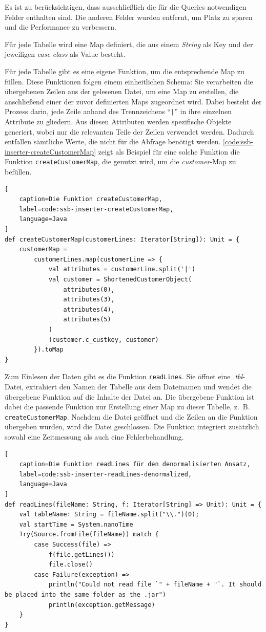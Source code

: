 Es ist zu berücksichtigen, dass ausschließlich die für die Queries notwendigen Felder enthalten sind. Die anderen Felder wurden entfernt, um Platz zu sparen und die Performance zu verbessern.

Für jede Tabelle wird eine Map definiert, die aus einem \emph{String} als Key und der jeweiligen \emph{case class} als Value besteht.

Für jede Tabelle gibt es eine eigene Funktion, um die entsprechende Map zu füllen. Diese Funktionen folgen einem einheitlichen Schema: Sie verarbeiten die übergebenen Zeilen aus der gelesenen Datei, um eine Map zu erstellen, die anschließend einer der zuvor definierten Maps zugeordnet wird. Dabei besteht der Prozess darin, jede Zeile anhand des Trennzeichens \enquote{\lstinline+|+} in ihre einzelnen Attribute zu gliedern. Aus diesen Attributen werden spezifische Objekte generiert, wobei nur die relevanten Teile der Zeilen verwendet werden. Dadurch entfallen sämtliche Werte, die nicht für die Abfrage benötigt werden. \cref{code:ssb-inserter-createCustomerMap} zeigt als Beispiel für eine solche Funktion die Funktion  \lstinline|createCustomerMap|, die genutzt wird, um die \emph{customer}-Map zu befüllen.

\begin{lstlisting}[
    caption=Die Funktion createCustomerMap,
    label=code:ssb-inserter-createCustomerMap,
    language=Java
]
def createCustomerMap(customerLines: Iterator[String]): Unit = {
	customerMap =
		customerLines.map(customerLine => {
			val attributes = customerLine.split('|')
			val customer = ShortenedCustomerObject(
				attributes(0),
				attributes(3),
				attributes(4),
				attributes(5)
			)
			(customer.c_custkey, customer)
		}).toMap
}
\end{lstlisting}


Zum Einlesen der Daten gibt es die Funktion \lstinline|readLines|. Sie öffnet eine \emph{.tbl}-Datei, extrahiert den Namen der Tabelle aus dem Dateinamen und wendet die übergebene Funktion auf die Inhalte der Datei an. Die übergebene Funktion ist dabei die passende Funktion zur Erstellung einer Map zu dieser Tabelle, z.~B. \lstinline|createCustomerMap|. Nachdem die Datei geöffnet und die Zeilen an die Funktion übergeben wurden, wird die Datei geschlossen. Die Funktion integriert zusätzlich sowohl eine Zeitmessung als auch eine Fehlerbehandlung.

\begin{lstlisting}[
    caption=Die Funktion readLines für den denormalisierten Ansatz,
    label=code:ssb-inserter-readLines-denormalized,
    language=Java
]
def readLines(fileName: String, f: Iterator[String] => Unit): Unit = {
	val tableName: String = fileName.split("\\.")(0);
	val startTime = System.nanoTime
	Try(Source.fromFile(fileName)) match {
		case Success(file) =>
			f(file.getLines())
			file.close()
		case Failure(exception) =>
			println("Could not read file `" + fileName + "`. It should be placed into the same folder as the .jar")
			println(exception.getMessage)
	}
}
\end{lstlisting}

